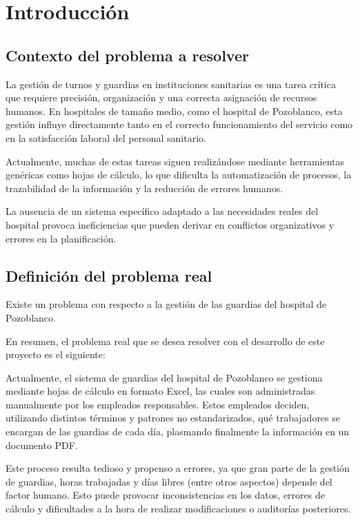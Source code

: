 \chapter{Introducción}

\section{Contexto del problema a resolver}

    La gestión de turnos y guardias en instituciones sanitarias es una tarea crítica que requiere precisión,
    organización y una correcta asignación de recursos humanos.
    En hospitales de tamaño medio, como el hospital de Pozoblanco, 
    esta gestión influye directamente tanto en el correcto funcionamiento del servicio como en la satisfacción laboral 
    del personal sanitario.

    Actualmente, muchas de estas tareas siguen realizándose mediante herramientas genéricas como hojas de cálculo,
    lo que dificulta la automatización de procesos, la trazabilidad de la información y la reducción de errores humanos. 
    
    La ausencia de un sistema específico adaptado a las necesidades reales del hospital provoca ineficiencias que pueden 
    derivar en conflictos organizativos y errores en la planificación.

\section{Definición del problema real}
    
    Existe un problema con respecto a la gestión de las guardias del hospital de Pozoblanco.

    En resumen, el problema real que se desea resolver con el desarrollo de este proyecto es el siguiente:

    Actualmente, el sistema de guardias del hospital de Pozoblanco se gestiona mediante hojas de cálculo en formato Excel, 
    las cuales son administradas manualmente por los empleados responsables. Estos empleados deciden, 
    utilizando distintos términos y patrones no estandarizados, qué trabajadores se encargan de las guardias de cada día, 
    plasmando finalmente la información en un documento PDF.

    Este proceso resulta tedioso y propenso a errores, ya que gran parte de la gestión de guardias, 
    horas trabajadas y días libres (entre otros aspectos) depende del factor humano. 
    Esto puede provocar inconsistencias en los datos, errores de cálculo y dificultades a la hora de realizar modificaciones 
    o auditorías posteriores.
